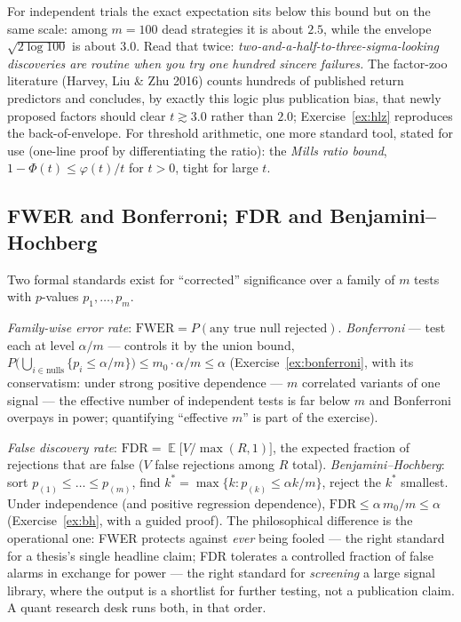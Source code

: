 \documentclass[11pt]{article}
\numberwithin{equation}{section}
\theoremstyle{plain}
\theoremstyle{definition}
\theoremstyle{remark}
\newcounter{exercise}
\DeclareMathOperator{\E}{\mathbb{E}}
\begin{document}
For independent trials the exact expectation sits below this bound but on the same scale: among $m = 100$ dead strategies it is about $2.5$, while the envelope $\sqrt{2\log 100}$ is about $3.0$. Read that twice: \emph{two-and-a-half-to-three-sigma-looking discoveries are routine when you try one hundred sincere failures.} The factor-zoo literature (Harvey, Liu \& Zhu 2016) counts hundreds of published return predictors and concludes, by exactly this logic plus publication bias, that newly proposed factors should clear $t \gtrsim 3.0$ rather than $2.0$; Exercise~\ref{ex:hlz} reproduces the back-of-envelope. For threshold arithmetic, one more standard tool, stated for use (one-line proof by differentiating the ratio): the \emph{Mills ratio bound}, $1 - \Phi(t) \le \varphi(t)/t$ for $t > 0$, tight for large $t$.

\subsection{FWER and Bonferroni; FDR and Benjamini--Hochberg}

Two formal standards exist for ``corrected'' significance over a family of $m$ tests with $p$-values $p_1, \dots, p_m$.

\emph{Family-wise error rate}: $\mathrm{FWER} = P(\text{any true null rejected})$. \emph{Bonferroni} --- test each at level $\alpha/m$ --- controls it by the union bound, $P\big(\bigcup_{i \in \text{nulls}} \{p_i \le \alpha/m\}\big) \le m_0 \cdot \alpha/m \le \alpha$ (Exercise~\ref{ex:bonferroni}, with its conservatism: under strong positive dependence --- $m$ correlated variants of one signal --- the effective number of independent tests is far below $m$ and Bonferroni overpays in power; quantifying ``effective $m$'' is part of the exercise).

\emph{False discovery rate}: $\mathrm{FDR} = \E\big[ V / \max(R, 1) \big]$, the expected fraction of rejections that are false ($V$ false rejections among $R$ total). \emph{Benjamini--Hochberg}: sort $p_{(1)} \le \dots \le p_{(m)}$, find $k^\ast = \max\{k : p_{(k)} \le \alpha k / m\}$, reject the $k^\ast$ smallest. Under independence (and positive regression dependence), $\mathrm{FDR} \le \alpha\, m_0/m \le \alpha$ (Exercise~\ref{ex:bh}, with a guided proof). The philosophical difference is the operational one: FWER protects against \emph{ever} being fooled --- the right standard for a thesis's single headline claim; FDR tolerates a controlled fraction of false alarms in exchange for power --- the right standard for \emph{screening} a large signal library, where the output is a shortlist for further testing, not a publication claim. A quant research desk runs both, in that order.
\end{document}
